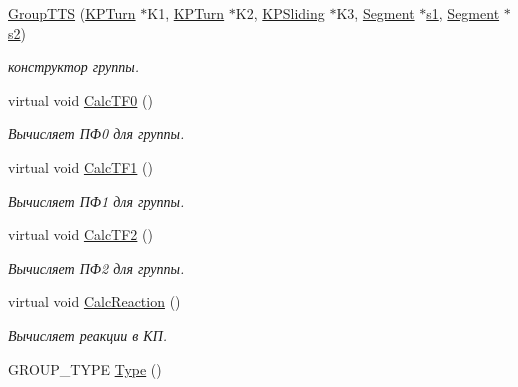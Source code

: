 \begin{DoxyCompactItemize}
\item 
\hyperlink{class_group_t_t_s_a6cefcab3cb39f156bd1c8dc63ea051e4}{GroupTTS} (\hyperlink{class_k_p_turn}{KPTurn} $\ast$K1, \hyperlink{class_k_p_turn}{KPTurn} $\ast$K2, \hyperlink{class_k_p_sliding}{KPSliding} $\ast$K3, \hyperlink{class_segment}{Segment} $\ast$\hyperlink{class_group2_a030b303d13894d1b4cc3fff13d0730e3}{s1}, \hyperlink{class_segment}{Segment} $\ast$\hyperlink{class_group2_aa48298daf05b4db8436dedf8d7b151ef}{s2})
\begin{DoxyCompactList}\small\item\em конструктор группы. \item\end{DoxyCompactList}\item 
virtual void \hyperlink{class_group_t_t_s_a5b88a7319af41fcd907f7c1dbc360535}{CalcTF0} ()
\begin{DoxyCompactList}\small\item\em Вычисляет ПФ0 для группы. \item\end{DoxyCompactList}\item 
virtual void \hyperlink{class_group_t_t_s_a61a8560b46b398bec329005e04dc4c0e}{CalcTF1} ()
\begin{DoxyCompactList}\small\item\em Вычисляет ПФ1 для группы. \item\end{DoxyCompactList}\item 
virtual void \hyperlink{class_group_t_t_s_a6f8491fcca4e6144eb9b8029e9e1f343}{CalcTF2} ()
\begin{DoxyCompactList}\small\item\em Вычисляет ПФ2 для группы. \item\end{DoxyCompactList}\item 
virtual void \hyperlink{class_group_t_t_s_a35255f38dcb14fd27097dd6be5305af1}{CalcReaction} ()
\begin{DoxyCompactList}\small\item\em Вычисляет реакции в КП. \item\end{DoxyCompactList}\item 
GROUP\_\-TYPE \hyperlink{class_group_t_t_s_adc59bc6cba2abfaaaa19554f83cced9a}{Type} ()
\end{DoxyCompactItemize}
